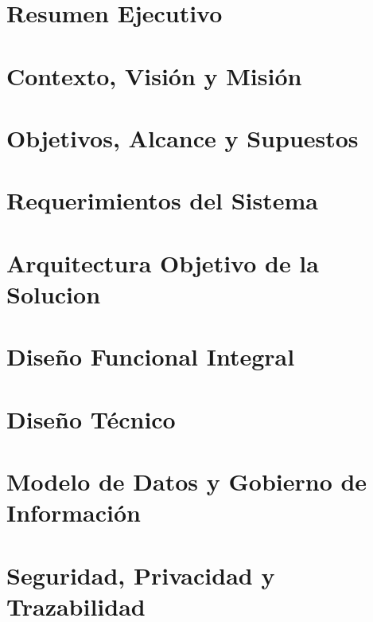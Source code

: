 \documentclass[12pt,a4paper]{report}
\begin{document}



\setcounter{page}{1}

\chapter{Resumen Ejecutivo}


\chapter{Contexto, Visión y Misión}


\chapter{Objetivos, Alcance y Supuestos}


\chapter{Requerimientos del Sistema}


\chapter{Arquitectura Objetivo de la Solucion}


\chapter{Diseño Funcional Integral}


\chapter{Diseño Técnico}


\chapter{Modelo de Datos y Gobierno de Información}


\chapter{Seguridad, Privacidad y Trazabilidad}

\end{document}
